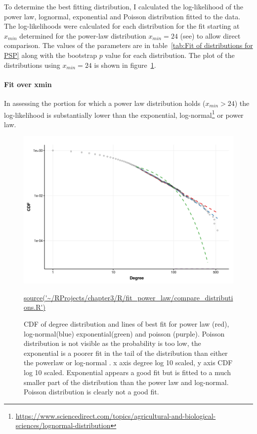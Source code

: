 To determine the best fitting distribution, I calculated the log-likelihood of the power law, lognormal, exponential and Poisson distribution fitted to the data. The log-likelihoods were calculated for each distribution for the fit starting at $x_{min}$ determined for the power-law distribution $x_{min} = 24$ (see\cite{clauset2009power}) to allow direct comparison. The values of the parameters are in table~\ref{tab:Fit of distributions for PSP} along with the bootstrap $p$ value for each distribution. The plot of the distributions using $x_{min}=24$ is shown in figure~\ref{fig:models_set_xmin}.


\paragraph{Fit over xmin}
In assessing the portion for which a power law distribution holds ($x_{min}>24$) the log-likelihood is substantially lower than the exponential, log-normal\footnote{\url{https://www.sciencedirect.com/topics/agricultural-and-biological-sciences/lognormal-distribution}} or power law. 

\begin{figure}
    \centering
    \includegraphics[width=\textwidth]{images/chapter3/poweRlaw/Rplot_models_xmin.png}
    \caption{CDF of degree distribution and lines of best fit for power law (red), log-normal(blue) exponential(green) and poisson (purple). Poisson distribution is not visible as the probability is too low, the exponential is a poorer fit in the tail of the distribution than either the powerlaw or log-normal . x axis degree log 10 scaled, y axis CDF log 10 scaled. Exponential appears a good fit but is fitted to a much smaller part of the distribution than the power law and log-normal. Poisson distribution is clearly not a good fit.}
    \small\url{source('~/RProjects/chapter3/R/fit_power_law/compare_distributions.R')}
    \label{fig:models_set_xmin}
\end{figure}

